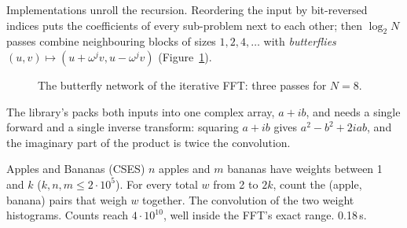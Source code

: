 Implementations unroll the recursion. Reordering the input by bit-reversed indices puts the coefficients of every sub-problem next to
each other; then $\log_2 N$ passes combine neighbouring blocks of sizes $1, 2, 4, \dots$ with \emph{butterflies} $(u, v) \mapsto (u +
\omega^j v, u - \omega^j v)$ (Figure~\ref{fig:butterfly}).

\begin{figure}[htbp]
\centering
{}
\caption{The butterfly network of the iterative FFT: three passes for $N = 8$.}
\label{fig:butterfly}
\end{figure}


The library's  packs both inputs into one complex array, $a + i b$, and needs a single forward and a single inverse
transform: squaring $a + ib$ gives $a^2 - b^2 + 2iab$, and the imaginary part of the product is twice the convolution.

\begin{problem}{Apples and Bananas (CSES)}
$n$ apples and $m$ bananas have weights between 1 and $k$ ($k, n, m \le 2 \cdot 10^5$). For every total $w$ from 2 to $2k$, count the
(apple, banana) pairs that weigh $w$ together.
\solution The convolution of the two weight histograms. Counts reach $4 \cdot 10^{10}$, well inside the FFT's exact range. 0.18\,s.
\end{problem}


